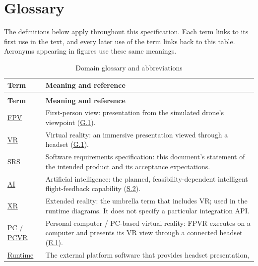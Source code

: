 \documentclass[12pt]{article}
\newcommand{\unumbered}[1]{%
  \phantomsection\section*{#1}\addcontentsline{toc}{section}{#1}}
\begin{document}
\newpage

\clearpage

\unumbered{Glossary}\label{sec:glossary}

The definitions below apply throughout this specification. Each term links to
its first use in the text, and every later use of the term links back to
this table. Acronyms appearing in
figures use these same meanings.

\begingroup
\small
\renewcommand{\arraystretch}{1.12}
\begin{longtable}{@{}>{\raggedright\arraybackslash}p{}
                         >{\raggedright\arraybackslash}p{}@{}}
\caption{Domain glossary and abbreviations}\label{tab:e-glossary}\\
\toprule
\textbf{Term} & \textbf{Meaning and reference} \\
\midrule\endfirsthead
\multicolumn{2}{l}{\small\textit{Table \thetable\ continued}}\\
\toprule\textbf{Term} & \textbf{Meaning and reference}\\\midrule\endhead
\midrule\multicolumn{2}{r}{\small\textit{Continued on next page}}\endfoot
\bottomrule\endlastfoot
\hyperlink{gl:FPV}{FPV}\hypertarget{glos:FPV}{} & First-person view: presentation from the simulated drone's viewpoint
(\hyperref[g1]{G.1}). \\
\hyperlink{gl:VR}{VR}\hypertarget{glos:VR}{} & Virtual reality: an immersive presentation viewed through a headset
(\hyperref[g1]{G.1}). \\
\hyperlink{gl:SRS}{SRS}\hypertarget{glos:SRS}{} & Software requirements specification: this document's statement of the
intended product and its acceptance expectations. \\
\hyperlink{gl:AI}{AI}\hypertarget{glos:AI}{} & Artificial intelligence: the planned, feasibility-dependent intelligent
flight-feedback capability (\hyperref[sec:s2-ai]{S.2}). \\
\hyperlink{gl:XR}{XR}\hypertarget{glos:XR}{} & Extended reality: the umbrella term that includes VR; used in the
runtime diagrams. It does not specify a particular integration API. \\
\hyperlink{gl:PCVR}{PC / PCVR}\hypertarget{glos:PCVR}{} & Personal computer / PC-based virtual reality: FPVR executes on a
computer and presents its VR view through a connected headset
(\hyperref[e1]{E.1}). \\
\hyperlink{gl:Runtime}{Runtime}\hypertarget{glos:Runtime}{} & The external platform software that provides headset presentation,

\end{longtable}
\end{document}

